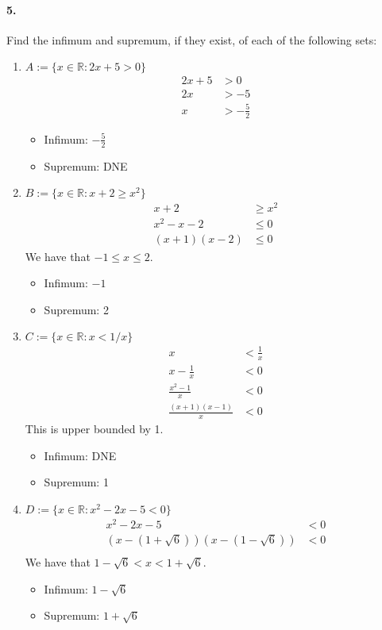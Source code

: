 \documentclass[12pt]{article}
\newcommand\R{\mathbb{R}}
\theoremstyle{remark}
\begin{document}
\paragraph{5.} Find the infimum and supremum, if they exist, of each of the following sets:
\begin{enumerate}[label=(\alph*)]
    \item $A := \{ x \in \R : 2x + 5 > 0 \}$
    \begin{align*}
        2x + 5 &> 0 \\
        2x &> -5 \\
        x &> -\frac{5}{2}
    \end{align*}
    \begin{itemize}
        \item Infimum: $-\frac{5}{2}$
        \item Supremum: DNE
    \end{itemize}
    
    \item $B := \{ x \in \R : x + 2 \geq x^2 \}$
    \begin{align*}
        x + 2 &\geq x^2 \\
        x^2 - x - 2 &\leq 0 \\
        (x + 1)(x - 2) &\leq 0
    \end{align*}
    We have that $-1 \leq x \leq 2$.
    \begin{itemize}
        \item Infimum: $-1$
        \item Supremum: 2
    \end{itemize}

    \item $C := \{ x \in \R : x < 1 / x \}$
    \begin{align*}
        x &< \frac{1}{x} \\
        x - \frac{1}{x} &< 0 \\
        \frac{x^2 - 1}{x} &< 0 \\
        \frac{(x + 1)(x - 1)}{x} &< 0
    \end{align*}
    This is upper bounded by 1.
    \begin{itemize}
        \item Infimum: DNE
        \item Supremum: 1
    \end{itemize}

    \item $D := \{ x \in \R : x^2 - 2x - 5 < 0 \}$
    \begin{align*}
        x^2 - 2x - 5 &< 0 \\
        (x - (1 + \sqrt{6}))(x - (1 - \sqrt{6})) &< 0 \\
    \end{align*}
    We have that $1 - \sqrt{6} < x < 1 + \sqrt{6}$.
    \begin{itemize}
        \item Infimum: $1 - \sqrt{6}$
        \item Supremum: $1 + \sqrt{6}$
    \end{itemize}
\end{enumerate}
\end{document}
